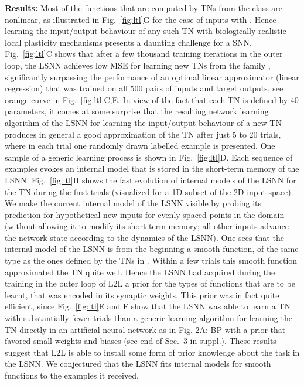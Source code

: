 \documentclass{article} \pdfoutput=1
\begin{document}
\textbf{Results:}
Most of the functions that are computed by TNs from the class  are nonlinear, as illustrated in  Fig.~\ref{fig:ltl}G for the case of inputs  with .
Hence learning the input/output behaviour of any such TN with biologically realistic local plasticity mechanisms presents a daunting challenge for a SNN.
Fig.~\ref{fig:ltl}C shows that after a few thousand training iterations in the outer loop, the LSNN achieves low MSE for learning new TNs from the family , significantly surpassing the performance of an optimal linear approximator (linear regression) that was trained on all 500 pairs of inputs and target outputs, see orange curve in Fig.~\ref{fig:ltl}C,E. 
In view of the fact that each TN is defined by 40 parameters, it comes at some surprise that the resulting network learning algorithm of the LSNN for learning the input/output behaviour of a new TN produces in general a good approximation of the TN after just 5 to 20 trials, where in each trial one randomly drawn labelled example is presented.
One sample of a generic learning process is shown in Fig.~\ref{fig:ltl}D.
Each sequence of examples evokes an internal model that is stored in the short-term memory of the LSNN.
Fig.~\ref{fig:ltl}H shows the fast evolution of internal models of the LSNN for the TN during the first trials (visualized for a 1D subset of the 2D input space).
We make the current internal model of the LSNN visible by probing its prediction  for hypothetical new inputs for evenly spaced points  in the domain (without allowing it to modify its short-term memory; all other inputs advance the network state according to the dynamics of the LSNN).
One sees that the internal model of the LSNN is from the beginning a smooth function, of the same type as the ones defined by the TNs in .
Within a few trials this smooth function approximated the TN quite well.
Hence the LSNN had acquired during the training in the outer loop of L2L a prior for the types of functions that are to be learnt, that was encoded in its synaptic weights.
This prior was in fact quite efficient, since Fig.~\ref{fig:ltl}E and F show that the LSNN was able to learn a TN with substantially fewer trials than a generic learning algorithm for learning the TN directly in an artificial neural network as in Fig. 2A: BP with a prior that favored small weights and biases (see end of Sec.~3 in suppl.).
These results suggest that L2L is able to install some form of prior knowledge about the task in the LSNN.
We conjectured that the LSNN fits internal models for smooth functions to the examples it received.
\end{document}
